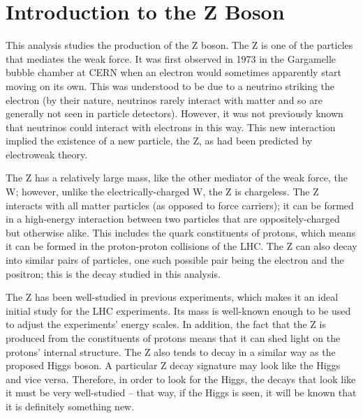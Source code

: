 


\section{Introduction to the Z Boson}
This analysis studies the production of the Z boson.  
The Z is one of the particles that mediates the weak force.  
It was first observed in 1973 in the Gargamelle bubble chamber at CERN %
when an electron would sometimes apparently start moving on its own.  
This was understood to be due to a neutrino striking the electron 
(by their nature, neutrinos rarely interact with matter and so are generally 
not seen in particle detectors).  
However, it was not previously known that neutrinos could interact 
with electrons in this way.  
This new interaction implied the existence of a new particle, the Z, 
as had been predicted by electroweak theory.  

The Z has a relatively large mass, 
like the other mediator of the weak force, the W; 
however, unlike the electrically-charged W, the Z is chargeless.  
The Z interacts with all matter particles (as opposed to force carriers); 
it can be formed in a high-energy interaction between 
two particles that are oppositely-charged but otherwise alike.  
This includes the quark constituents of protons, 
which means it can be formed in the proton-proton collisions 
of the LHC.  
The Z can also decay into similar pairs of particles, 
one such possible pair being the electron and the positron; 
this is the decay studied in this analysis.  

The Z has been well-studied in previous experiments, 
which makes it an ideal initial study for the LHC experiments.  
Its mass is well-known enough to be used to 
adjust the experiments' energy scales.  
In addition, the fact that the Z is produced from the 
constituents of protons 
means that it can shed light on the protons' internal structure.   
The Z also tends to decay in a similar way as the 
proposed Higgs boson. %
A particular Z decay signature may 
look like the Higgs and vice versa.  
Therefore, in order to look for the Higgs, 
the decays that look like it must be very well-studied -- 
that way, if the Higgs is seen, 
it will be known that it is definitely something new.  


